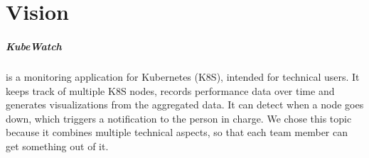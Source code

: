 \chapter{Vision}


\paragraph{KubeWatch} is a monitoring application for Kubernetes (K8S), intended for technical users.
It keeps track of multiple K8S nodes, records performance data over time and generates visualizations from the aggregated data.
It can detect when a node goes down, which triggers a notification to the person in charge.
We chose this topic because it combines multiple technical aspects, so that each team member can get something out of it.
